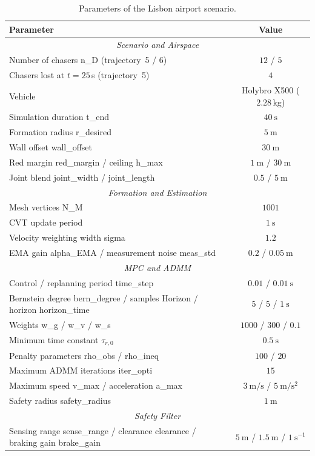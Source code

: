 \begin{table}[htbp]
    \centering
    \caption{Parameters of the Lisbon airport scenario.}
    \label{tab.6:lisbon_params}
    \begin{tabular}{l c}
    \hline
    \textbf{Parameter} & \textbf{Value} \\
    \hline
    \multicolumn{2}{c}{\textit{Scenario and Airspace}} \\
    \hline
    Number of chasers \gls{n_D} (trajectory~5 / 6) & $12$ / $5$ \\
    Chasers lost at $t=25$\,s (trajectory~5) & $4$ \\
    Vehicle & Holybro X500 ($2.28$\,kg) \\
    Simulation duration \gls{t_end} & $40~\mathrm{s}$ \\
    Formation radius \gls{r_desired} & $5~\mathrm{m}$ \\
    Wall offset \gls{wall_offset} & $30~\mathrm{m}$ \\
    Red margin \gls{red_margin} / ceiling \gls{h_max} & $1~\mathrm{m}$ / $30~\mathrm{m}$ \\
    Joint blend \gls{joint_width} / \gls{joint_length} & $0.5$ / $5~\mathrm{m}$ \\
    \hline
    \multicolumn{2}{c}{\textit{Formation and Estimation}} \\
    \hline
    Mesh vertices \gls{N_M} & $1001$ \\
    \gls{CVT} update period & $1~\mathrm{s}$ \\
    Velocity weighting width \gls{sigma} & $1.2$ \\
    \gls{EMA} gain \gls{alpha_EMA} / measurement noise \gls{meas_std} & $0.2$ / $0.05~\mathrm{m}$ \\
    \hline
    \multicolumn{2}{c}{\textit{MPC and ADMM}} \\
    \hline
    Control / replanning period \gls{time_step} & $0.01$ / $0.01~\mathrm{s}$ \\
    Bernstein degree \gls{bern_degree} / samples \gls{Horizon} / horizon \gls{horizon_time} & $5$ / $5$ / $1~\mathrm{s}$ \\
    Weights \gls{w_g} / \gls{w_v} / \gls{w_s} & $1000$ / $300$ / $0.1$ \\
    Minimum time constant $\tau_{r,0}$ & $0.5~\mathrm{s}$ \\
    Penalty parameters \gls{rho_obs} / \gls{rho_ineq} & $100$ / $20$ \\
    Maximum \gls{ADMM} iterations \gls{iter_opti} & $15$ \\
    Maximum speed \gls{v_max} / acceleration \gls{a_max} & $3~\mathrm{m/s}$ / $5~\mathrm{m/s^2}$ \\
    Safety radius \gls{safety_radius} & $1~\mathrm{m}$ \\
    \hline
    \multicolumn{2}{c}{\textit{Safety Filter}} \\
    \hline
    Sensing range \gls{sense_range} / clearance \gls{clearance} / braking gain \gls{brake_gain} & $5~\mathrm{m}$ / $1.5~\mathrm{m}$ / $1~\mathrm{s^{-1}}$ \\
    \hline
    \end{tabular}
\end{table}

